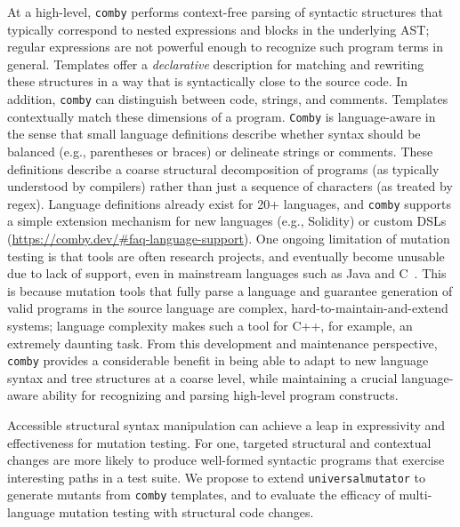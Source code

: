 At a high-level, {\tt comby} performs
context-free
parsing of syntactic structures that typically correspond to nested
expressions and blocks in the underlying AST; regular expressions are not powerful enough to recognize such program terms in general. Templates offer a \emph{declarative} description for matching and rewriting these structures in a way that is syntactically close to the source code.
In addition, {\tt comby} can distinguish between code, strings, and comments. Templates contextually match these dimensions of a program. %
{\tt Comby} is language-aware in the sense that small language
definitions describe whether syntax should be balanced (e.g.,
parentheses or braces) or delineate strings or comments. These
definitions describe a coarse structural decomposition of programs (as
typically understood by compilers) rather than just a sequence of
characters (as treated by regex). Language definitions already exist
for 20+ languages, and {\tt comby} supports a simple extension
mechanism for new languages (e.g., Solidity) or custom DSLs (\url{https://comby.dev/\#faq-language-support}).
One ongoing limitation of mutation testing is that tools are often research
projects, and eventually become unusable due to lack of support, even in
mainstream languages such as Java and C~\cite{MutChoice}.
This is because mutation tools that fully parse a language and guarantee generation of
valid programs in the source language are complex, hard-to-maintain-and-extend
systems; language complexity makes such a tool for C++, for example, an extremely daunting task. From this development and maintenance perspective, {\tt comby} provides a considerable benefit in being able to adapt to new language syntax and tree structures at a coarse level, while maintaining a crucial language-aware ability for recognizing and parsing high-level program constructs.

Accessible structural syntax manipulation can achieve a leap in
expressivity and effectiveness for mutation testing. %
For one, targeted structural and contextual changes are
more likely to produce well-formed syntactic programs
that exercise interesting paths in a test suite.
We propose to extend {\tt universalmutator}
to generate mutants from {\tt comby} templates, and to evaluate the efficacy of
multi-language mutation testing with structural code changes.

